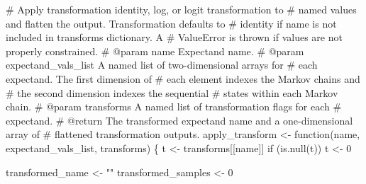 \documentclass[
  letterpaper,
  DIV=11,
  numbers=noendperiod]{scrartcl}
\newenvironment{Shaded}{\begin{snugshade}}{\end{snugshade}}
\newcommand{\CommentTok}[1]{\textcolor[rgb]{0.37,0.37,0.37}{#1}}
\newcommand{\ControlFlowTok}[1]{\textcolor[rgb]{0.00,0.23,0.31}{#1}}
\newcommand{\DecValTok}[1]{\textcolor[rgb]{0.68,0.00,0.00}{#1}}
\newcommand{\KeywordTok}[1]{\textcolor[rgb]{0.00,0.23,0.31}{#1}}
\newcommand{\NormalTok}[1]{\textcolor[rgb]{0.00,0.23,0.31}{#1}}
\newcommand{\OperatorTok}[1]{\textcolor[rgb]{0.37,0.37,0.37}{#1}}
\newcommand{\StringTok}[1]{\textcolor[rgb]{0.13,0.47,0.30}{#1}}
\begin{document}
\begin{Shaded}
\begin{Highlighting}[]
\CommentTok{\# Apply transformation identity, log, or logit transformation to}
\CommentTok{\# named values and flatten the output.  Transformation defaults to}
\CommentTok{\# identity if name is not included in \textasciigrave{}transforms\textasciigrave{} dictionary.  A }
\CommentTok{\# ValueError is thrown if values are not properly constrained.}
\CommentTok{\# @param name Expectand name.}
\CommentTok{\# @param expectand\_vals\_list A named list of two{-}dimensional arrays for}
\CommentTok{\#                            each expectand.  The first dimension of}
\CommentTok{\#                            each element indexes the Markov chains and}
\CommentTok{\#                            the second dimension indexes the sequential}
\CommentTok{\#                            states within each Markov chain.}
\CommentTok{\# @param transforms A named list of transformation flags for each }
\CommentTok{\#                   expectand.}
\CommentTok{\# @return The transformed expectand name and a one{-}dimensional array of}
\CommentTok{\#         flattened transformation outputs.}
\NormalTok{apply\_transform }\OperatorTok{\textless{}{-}}\NormalTok{ function(name, expectand\_vals\_list, transforms) \{}
\NormalTok{  t }\OperatorTok{\textless{}{-}}\NormalTok{ transforms[[name]]}
  \ControlFlowTok{if}\NormalTok{ (}\KeywordTok{is}\NormalTok{.null(t)) t }\OperatorTok{\textless{}{-}} \DecValTok{0}
  
\NormalTok{  transformed\_name }\OperatorTok{\textless{}{-}} \StringTok{""}
\NormalTok{  transformed\_samples }\OperatorTok{\textless{}{-}} \DecValTok{0}
 

\end{Highlighting}
\end{Shaded}
\end{document}

